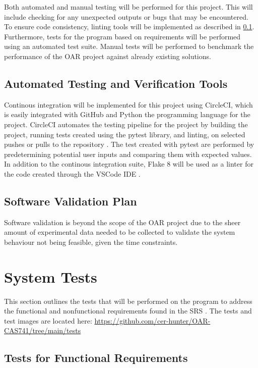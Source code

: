 \documentclass[12pt, titlepage]{article}
\begin{document}
Both automated and manual testing will be performed for this project. This will include checking for any unexpected outputs or bugs that may be encountered.
To ensure code consistency, linting tools will be implemented as described in \ref{Tools}. Furthermore,
tests for the program based on requirements will be performed using an automated test suite. Manual tests will be 
performed to benchmark the performance of the OAR project against already existing solutions.


\subsection{Automated Testing and Verification Tools} \label{Tools}

Continous integration will be implemented for this project using CircleCI, which 
is easily integrated with GitHub and Python the programming language for the project. CircleCI automates the testing 
pipeline for the project by building the project, running tests created using the pytest library, and linting,
on selected pushes or pulls to the repository \citep{CircleCI}. The test created with pytest are performed by predetermining potential user
inputs and comparing them with expected values. In addition to the continous integration suite, Flake 8 will be used as a 
linter for the code created through the VSCode IDE \citep{Flake8}.

\subsection{Software Validation Plan}

Software validation is beyond the scope of the OAR project due to the sheer amount of experimental data needed to be collected to 
validate the system behaviour not being feasible, given the time constraints. 

\section{System Tests}

This section outlines the tests that will be performed on the program to address the functional and nonfunctional requirements
found in the SRS \citep{SRS}. The tests and test images are located here:
\url{https://github.com/cer-hunter/OAR-CAS741/tree/main/tests}

	
\subsection{Tests for Functional Requirements}
\end{document}
